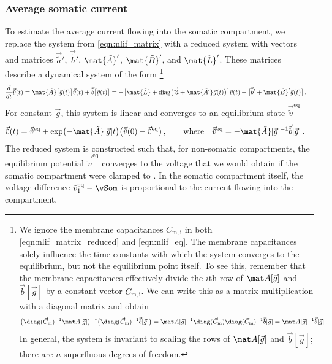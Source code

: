 \subsubsection{Average somatic current}
To estimate the average current flowing into the somatic compartment, we replace the system from \cref{eqn:nlif_matrix} with a reduced system with vectors and matrices $\vec{\tilde a}'$, $\vec{\tilde b}'$, $\mat{\tilde A}'$, $\mat{\tilde B}'$, and $\mat{\tilde L}'$.
These matrices describe a dynamical system of the form%
\footnote{
We ignore the membrane capacitances $C_\mathrm{m, i}$ in both \cref{eqn:nlif_matrix_reduced} and \cref{eqn:nlif_eq}.
The membrane capacitances solely influence the time-constants with which the system converges to the equilibrium, but not the equilibrium point itself.
To see this, remember that the membrane capacitances effectively divide the $i$th row of $\mat A[\vec g]$ and $\vec b[\vec g]$ by a constant vector $C_\mathrm{m, i}$. We can write this as a matrix-multiplication with a diagonal matrix and obtain
\begin{align*}
	\bigl(\diag(\vec C_\mathrm{m})^{-1} \mat A[\vec g]\bigr)^{-1} \bigl(\diag(\vec C_\mathrm{m})^{-1} \vec b[\vec g]\bigr) = \mat A[\vec g]^{-1} \diag(\vec C_\mathrm{m}) \diag(\vec C_\mathrm{m})^{-1} \vec b[\vec g] = \mat A[\vec g]^{-1} \vec b[\vec g] \,.
\end{align*}
In general, the system is invariant to scaling the rows of $\mat A[\vec g]$ and $\vec b[\vec g]$; there are $n$ superfluous degrees of freedom.
}
\begin{align}
	\frac{d}{dt} \vec{\tilde v}(t)
	&= \mat{\tilde A}\big[\vec g(t)\big] \vec{\tilde v}(t) + \vec{\tilde b}\big[\vec g(t)\big]
	 = -\big[\mat{\tilde L} + \mathrm{diag}\big(\vec{\tilde a'} + \mat{\tilde A'} \vec g(t)\big)\big] \vec v(t) + \big[\vec{\tilde b}' + \mat{\tilde B}' \vec g(t)\big] \,.
	\label{eqn:nlif_matrix_reduced}
\end{align}
For constant $\vec g$, this system is linear and converges to an equilibrium state $\vec {\tilde v}^\mathrm{eq}$
\begin{align}
	\vec{\tilde v}(t)
	=
	  \vec{\tilde v}^\mathrm{eq}
	+ \exp\bigl(
		-\mat{\tilde A}[\vec g] t
	  \bigr) \bigl(
	    \vec{\tilde v}(0) - \vec{\tilde v}^\mathrm{eq}
	  \bigr) \,,
	\quad\quad \text{where} \quad \vec{\tilde v}^\mathrm{eq} &= -{\mat{\tilde A}}[\vec g]^{-1} \vec{\tilde b}[\vec g] \,.
	\label{eqn:nlif_eq}
\end{align}
The reduced system is constructed such that, for non-somatic compartments, the equilibrium potential $\vec{\tilde v}^\mathrm{eq}$ converges to the voltage that we would obtain if the somatic compartment were clamped to \vSom. In the somatic compartment itself, the voltage difference $\tilde v^\mathrm{eq}_1 - \vSom$ is proportional to the current flowing into the compartment.
